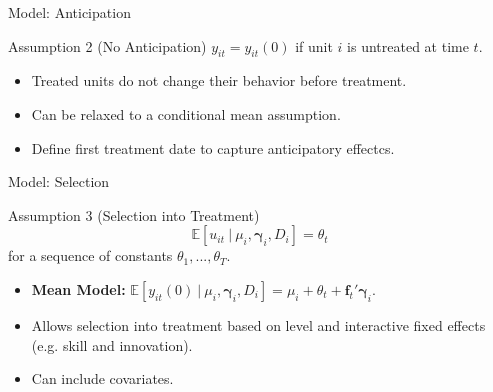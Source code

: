\documentclass{beamer}
\newcommand{\1}{\mathds{1}} %
\newcommand{\condexpec}[2]{\mathbb{E}\left[#1 \ \vert \ #2\right]}
\begin{document}

\begin{frame}{Model: Anticipation}
    \begin{block}{Assumption 2 (No Anticipation)}
        $y_{it} = y_{it}(0)$ if unit $i$ is untreated at time $t$.
    \end{block}
    \begin{itemize}
        \item Treated units do not change their behavior before treatment.
        \item Can be relaxed to a conditional mean assumption. 
        \item Define first treatment date to capture anticipatory effectcs.  
    \end{itemize}
\end{frame}


\begin{frame}{Model: Selection}
    \begin{block}{Assumption 3 (Selection into Treatment)}
        \begin{equation*}
            \condexpec{u_{it}}{\mu_i, \bm \gamma_i, D_i} = \theta_t
        \end{equation*}
        for a sequence of constants $\theta_1,...,\theta_T$.
    \end{block}
    \begin{itemize}
        \item \textbf{Mean Model:} $\condexpec{y_{it}(0)}{\mu_i, \bm \gamma_i, D_i} = \mu_i + \theta_t + \bm f_t' \bm \gamma_i$.
        \item Allows selection into treatment based on level and interactive fixed effects (e.g. skill and innovation).
        \item Can include covariates.
    \end{itemize}
\end{frame}

\end{document}
